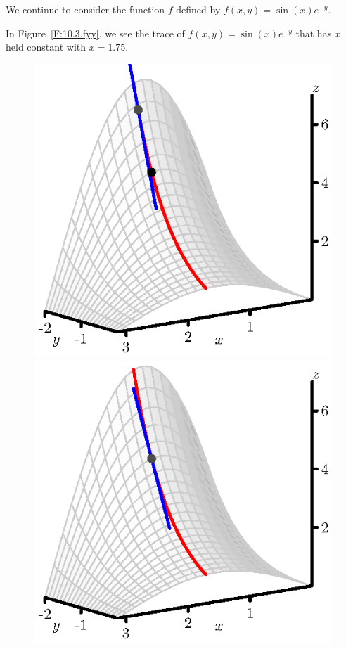 \begin{activity} \label{A:10.3.2a} 
We continue to consider the function $f$ defined by $f(x,y) = \sin(x) e^{-y}$.
    \ba
	\item  In Figure~\ref{F:10.3.fyy}, we see the trace of $f(x,y) = \sin(x) e^{-y}$ that has $x$ held constant with $x = 1.75$. 
\begin{figure}[ht]
  \begin{center}
    \includegraphics[scale=0.8]{figures/fig_10_3_fyy_1.eps}
    \includegraphics[scale=0.8]{figures/fig_10_3_fyy_2.eps}

\end{center}
\end{figure}
\end{activity}
